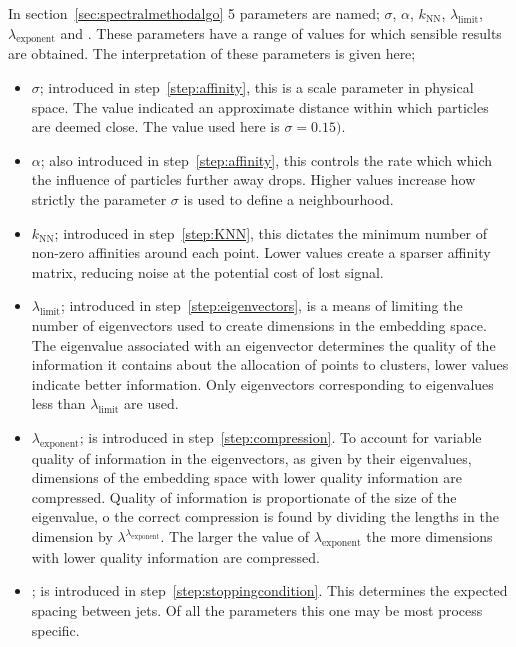 In section~\ref{sec:spectralmethodalgo} 5 parameters are named;
\(\sigma\), \(\alpha\), \(k_\text{NN}\), \(\lambda_\text{limit}\), \(\lambda_\text{exponent}\) and \stoppingdeltar{}.
These parameters have a range of values for which sensible results are obtained.
The interpretation of these parameters is given here;
\begin{itemize}
    \item \(\sigma\); introduced in step~\ref{step:affinity}, this is a scale parameter in physical space.
                      The value indicated an approximate distance within which particles are deemed close.
                      The value used here is \(\sigma = 0.15)\).
    \item  \(\alpha\); also introduced in step~\ref{step:affinity}, this controls the rate which which 
           the influence of particles further away drops. 
           Higher values increase how strictly the parameter \(\sigma\) is used to define a neighbourhood.
       \item \(k_\text{NN}\); introduced in step~\ref{step:KNN}, this dictates the minimum number of non-zero affinities around each point.
           Lower values create a sparser affinity matrix, reducing noise at the potential cost of lost signal.
       \item  \(\lambda_\text{limit}\); introduced in step~\ref{step:eigenvectors}, is a means of limiting the number of eigenvectors used
           to create dimensions in the embedding space.
           The eigenvalue associated with an eigenvector determines the quality of the information it contains about the allocation of points to clusters,
           lower values indicate better information.
           Only eigenvectors corresponding to eigenvalues less than \(\lambda_\text{limit}\) are used.
       \item  \(\lambda_\text{exponent}\); is introduced in step~\ref{step:compression}.
           To account for variable quality of information in the eigenvectors, as given by their eigenvalues,
        dimensions of the embedding space with lower quality information are compressed.
        Quality of information is proportionate of the size of the eigenvalue, o the correct compression is found by
        dividing the lengths in the dimension by \(\lambda^{\lambda_\text{exponent}}\).
        The larger the value of \(\lambda_\text{exponent}\) the more dimensions with lower quality information are compressed.
    \item \stoppingdeltar{}; is introduced in step~\ref{step:stoppingcondition}.
         This determines the expected spacing between jets. 
         Of all the parameters this one may be most process specific.
\end{itemize}


